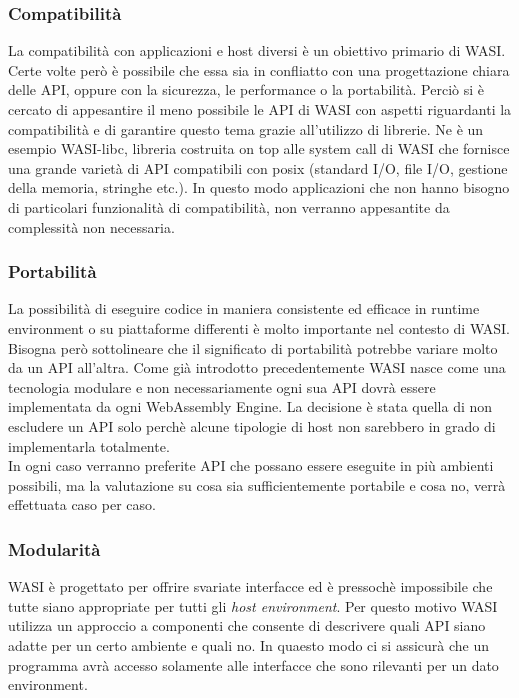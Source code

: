 \subsubsection{Compatibilità}
La compatibilità con applicazioni e host diversi è un obiettivo primario di WASI. Certe volte però è possibile che essa sia in confliatto con una progettazione chiara delle API, oppure con la sicurezza, le performance o la portabilità.
Perciò si è cercato di appesantire il meno possibile le API di WASI con aspetti riguardanti la compatibilità e di garantire questo tema grazie all'utilizzo di librerie. Ne è un esempio WASI-libc, libreria costruita on top alle system call di WASI che fornisce una grande varietà di API compatibili con posix (standard I/O, file I/O, gestione della memoria, stringhe etc.).
In questo modo applicazioni che non hanno bisogno di particolari funzionalità di compatibilità, non verranno appesantite da complessità non necessaria.
\subsubsection{Portabilità}
La possibilità di eseguire codice in maniera consistente ed efficace in runtime environment o su piattaforme differenti è molto importante nel contesto di WASI. Bisogna però sottolineare che il significato di portabilità potrebbe variare molto da un API all'altra. Come già introdotto precedentemente WASI nasce come una tecnologia modulare e non necessariamente ogni sua API dovrà essere implementata da ogni WebAssembly Engine.
La decisione è stata quella di non escludere un API solo perchè alcune tipologie di host non sarebbero in grado di implementarla totalmente.
\\In ogni caso verranno preferite API che possano essere eseguite in più ambienti possibili, ma la valutazione su cosa sia sufficientemente portabile e cosa no, verrà effettuata caso per caso.
\subsubsection{Modularità}
WASI è progettato per offrire svariate interfacce ed è pressochè impossibile che tutte siano appropriate per tutti gli \emph{host environment}. Per questo motivo WASI utilizza un approccio a componenti che consente di descrivere quali API siano adatte per un certo ambiente e quali no. In quaesto modo ci si assicurà che un programma avrà accesso solamente alle interfacce che sono rilevanti per un dato environment.
